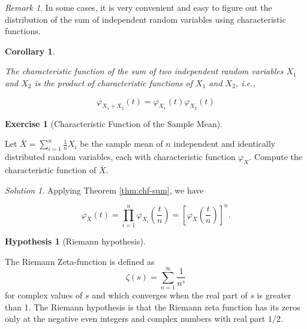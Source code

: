 \documentclass[
  12pt,
]{krantz}
\newtheorem{corollary}{Corollary}[chapter]
\theoremstyle{definition}
\theoremstyle{definition}
\theoremstyle{definition}
\newtheorem{exercise}{Exercise}[chapter]
\theoremstyle{definition}
\newtheorem{hypothesis}{Hypothesis}[chapter]
\theoremstyle{remark}
\newtheorem*{remark}{Remark}
\newtheorem*{solution}{Solution}
\begin{document}
\begin{remark}

In some cases, it is very convenient and easy to figure out the distribution of the sum of independent random variables using characteristic functions.

\end{remark}

\begin{corollary}
\protect\hypertarget{cor:unlabeled-div-6}{}\label{cor:unlabeled-div-6}

The characteristic function of the sum of two independent random variables \(X_1\) and \(X_2\) is the product of characteristic functions of \(X_1\) and \(X_2\), i.e.,

\[\varphi _{X_1+X_2}(t)=\varphi _{X_1}(t) \varphi _{X_2}(t)\]

\end{corollary}

\begin{exercise}[Characteristic Function of the Sample Mean]
\protect\hypertarget{exr:unlabeled-div-7}{}\label{exr:unlabeled-div-7}

Let \(\bar{X}=\sum_{i=1}^n \frac{1}{n} X_i\) be the sample mean of \(n\) independent and identically distributed random variables, each with characteristic function \(\varphi _{X}\). Compute the characteristic function of \(\bar{X}\).

\end{exercise}

\begin{solution}

Applying Theorem \ref{thm:chf-sum}, we have

\[\varphi _{\bar{X}}(t)=\prod_{i=1}^n \varphi _{X_i}\left(\frac{t}{n}\right)=\left[\varphi _{X}\left(\frac{t}{n}\right)\right]^n.\]

\end{solution}

\begin{hypothesis}[Riemann hypothesis]
\protect\hypertarget{hyp:unlabeled-div-9}{}\label{hyp:unlabeled-div-9}

The Riemann Zeta-function is defined as
\[\zeta(s) = \sum_{n=1}^{\infty} \frac{1}{n^s}\]
for complex values of \(s\) and which converges when the real part of \(s\) is greater than 1. The Riemann hypothesis is that the Riemann zeta function has its zeros only at the negative even integers and complex numbers with real part \(1/2\).

\end{hypothesis}
\end{document}
